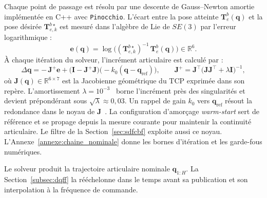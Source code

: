 Chaque point de passage est résolu par une descente de Gauss--Newton amortie implémentée en C++ avec \texttt{Pinocchio}. L'écart entre la pose atteinte $\mathbf{T}_{e}^{b}(\mathbf{q})$ et la pose désirée $\mathbf{T}_{e,k}^{b\star}$ est mesuré dans l'algèbre de Lie de $SE(3)$ par l'erreur logarithmique :
\begin{equation}\label{eq:ik_error}
  \mathbf{e}(\mathbf{q}) = \log\!\big( (\mathbf{T}_{e,k}^{b\star})^{-1}\,\mathbf{T}_{e}^{b}(\mathbf{q}) \big) \in \mathbb{R}^6.
\end{equation}
À chaque itération du solveur, l'incrément articulaire est calculé par :
\begin{equation}\label{eq:ik_update}
  \Delta\mathbf{q} = -\,\mathbf{J}^{+}\mathbf{e} + \big(\mathbf{I}-\mathbf{J}^{+}\mathbf{J}\big)\big(-k_0(\mathbf{q}-\mathbf{q}_{\mathrm{ref}})\big),
  \qquad
  \mathbf{J}^{+}=\mathbf{J}^{\top}\big(\mathbf{J}\mathbf{J}^{\top}+\lambda\mathbf{I}\big)^{-1},
\end{equation}
où $\mathbf{J}(\mathbf{q})\in\mathbb{R}^{6\times7}$ est la Jacobienne géométrique du \ac{TCP} exprimée dans son repère. L'amortissement $\lambda=10^{-3}$~\cite{Nakamura1986Singularity, Wampler1986Damped} borne l'incrément près des singularités et devient prépondérant sous $\sqrt{\lambda}\approx0{,}03$. Un rappel de gain $k_0$ vers $\mathbf{q}_{\mathrm{ref}}$ résout la redondance dans le noyau de $\mathbf{J}$~\cite{Liegeois1977Redundancy}. La configuration d'amorçage \textit{warm-start} sert de référence et se propage depuis la mesure courante pour maintenir la continuité articulaire. Le filtre de la Section~\ref{sec:sdfcbf} exploite aussi ce noyau. L'Annexe~\ref{annexe:chaine_nominale} donne les bornes d'itération et les garde-fous numériques.

Le solveur produit la trajectoire articulaire nominale $\mathbf{q}_{1:H}$. La Section~\ref{subsec:dqff} la rééchelonne dans le temps avant sa publication et son interpolation à la fréquence de commande.

